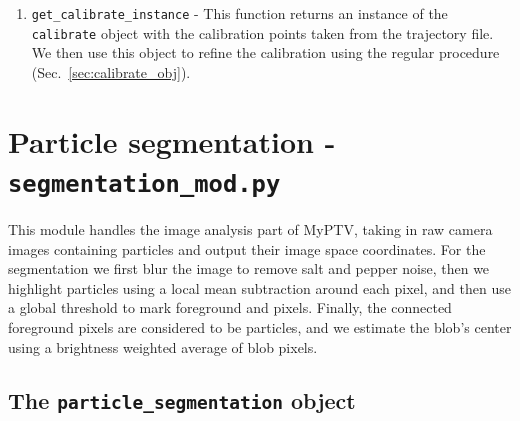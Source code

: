 \documentclass[10pt,a4paper]{article}
\begin{document}
\begin{enumerate}
	
	\item \texttt{get\_calibrate\_instance} - This function returns an instance of the \texttt{calibrate} object with the calibration points taken from the trajectory file. We then use this object to refine the calibration using the regular procedure (Sec.~\ref{sec:calibrate_obj}).

\end{enumerate}







\section{Particle segmentation - \texttt{segmentation\_mod.py}} 


This module handles the image analysis part of MyPTV, taking in raw camera images containing particles and output their image space coordinates. For the segmentation we first blur the image to remove salt and pepper noise, then we highlight particles using a local mean subtraction around each pixel, and then use a global threshold to mark foreground and  pixels. Finally, the connected foreground pixels are considered to be particles, and we estimate the blob's center using a brightness weighted average of blob pixels.



\subsection{The \texttt{particle\_segmentation} object} 
\end{document}
